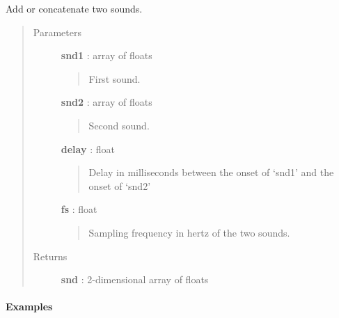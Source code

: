 \documentclass[a4paper,12pt,english]{sphinxmanual}
\begin{document}
\begin{fulllineitems}
\label{sndlib:sndlib.addSounds}
Add or concatenate two sounds.
\begin{quote}\begin{description}
\item[{Parameters }] \leavevmode
\textbf{snd1} : array of floats
\begin{quote}

First sound.
\end{quote}

\textbf{snd2} : array of floats
\begin{quote}

Second sound.
\end{quote}

\textbf{delay} : float
\begin{quote}

Delay in milliseconds between the onset of `snd1' and the onset of `snd2'
\end{quote}

\textbf{fs} : float
\begin{quote}

Sampling frequency in hertz of the two sounds.
\end{quote}

\item[{Returns }] \leavevmode
\textbf{snd} : 2-dimensional array of floats

\end{description}\end{quote}
\paragraph{Examples}


\end{fulllineitems}
\end{document}
